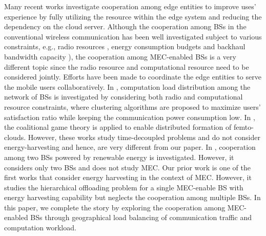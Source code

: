 \documentclass[12pt, draftclsnofoot, letterpaper, onecolumn]{IEEEtran}
\begin{document}

Many recent works \cite{chen2016socially, queis2015fogbalancing, xiao2017qoe} investigate cooperation among edge entities to improve uses' experience by fully utilizing the resource within the edge system and reducing the dependency on the cloud server. Although the cooperation among BSs in the conventional wireless communication has been well investigated subject to various constraints, e.g., radio resources \cite{abdelnasser2014clustering}, energy consumption budgets \cite{rubio2014association} and backhaul bandwidth capacity \cite{tam2017joint}), the cooperation among MEC-enabled BSs is a very different topic since the radio resource and computational resource need to be considered jointly. Efforts have been made to coordinate the edge entities to serve the mobile users collaboratively. In \cite{queis2015fogbalancing,queis2015small}, computation load distribution among the network of BSs is investigated by considering both radio and computational resource constraints, where clustering algorithms are proposed to maximize users' satisfaction ratio while keeping the communication power consumption low. In \cite{chen2016socially,tanzil2016distributed,Guruacharya2013Dynamic}, the coalitional game theory is applied to enable distributed formation of femto-clouds. However, these works study time-decoupled problems and do not consider energy-harvesting and hence, are very different from our paper. In \cite{gong2016networked}, cooperation among two BSs powered by renewable energy is investigated. However, it considers only two BSs and does not study MEC. Our prior work \cite{xu2017online} is one of the first works that consider energy harvesting in the context of MEC. However, it studies the hierarchical offloading problem for a single MEC-enable BS with energy harvesting capability but neglects the cooperation among multiple BSs. In this paper, we complete the story by exploring the cooperation among MEC-enabled BSs through geographical load balancing of communication traffic and computation workload.
\end{document}
